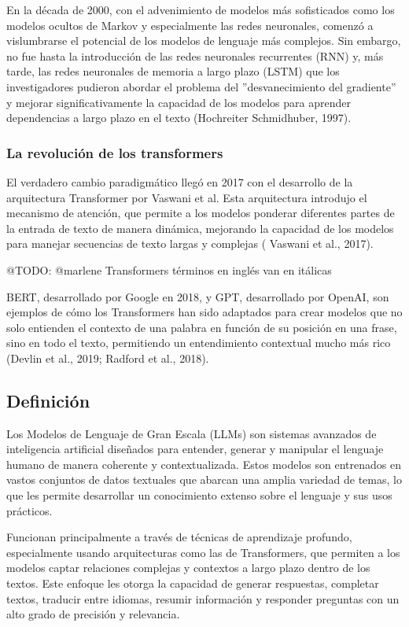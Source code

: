 En la década de 2000, con el advenimiento de modelos más sofisticados como los modelos ocultos de Markov
y especialmente las redes neuronales, comenzó a vislumbrarse el
potencial de los modelos de lenguaje más complejos.
Sin embargo, no fue hasta la introducción de las redes neuronales recurrentes (RNN) y, más tarde, las redes neuronales
de memoria a largo plazo (LSTM)
que los investigadores pudieron abordar el problema del ''desvanecimiento del gradiente''
y mejorar significativamente la capacidad de los
modelos para aprender dependencias a largo plazo en el texto (Hochreiter Schmidhuber, 1997).

\subsubsection*{La revolución de los transformers}
El verdadero cambio paradigmático llegó en 2017 con el desarrollo de la arquitectura
Transformer por Vaswani et al.
Esta arquitectura introdujo el mecanismo de atención, que permite a los modelos ponderar diferentes partes de la entrada
de texto de manera dinámica, mejorando la capacidad de los modelos para manejar secuencias de texto largas y complejas (
Vaswani et al., 2017).

\colorbox{color_highlight}{@TODO: @marlene Transformers términos en inglés van en itálicas}

BERT, desarrollado por Google en 2018, y GPT, desarrollado por OpenAI, son ejemplos de
cómo los Transformers han sido adaptados para crear modelos que
no solo entienden el contexto de una palabra en función de su posición en una frase, sino en todo
el texto, permitiendo un entendimiento contextual mucho más rico (Devlin et al., 2019; Radford et al., 2018).

\subsection{Definición}
Los Modelos de Lenguaje de Gran Escala (LLMs) son sistemas
avanzados de inteligencia artificial diseñados para entender, generar y
manipular el lenguaje humano de manera coherente y contextualizada. Estos
modelos son entrenados en vastos conjuntos de datos textuales que abarcan una amplia variedad de temas, lo que les
permite desarrollar un conocimiento extenso sobre el lenguaje y sus usos prácticos.

Funcionan principalmente a través de técnicas de aprendizaje
profundo, especialmente usando arquitecturas como las de Transformers,
que permiten a los modelos captar relaciones complejas y contextos a largo plazo dentro de los textos. Este enfoque les
otorga la capacidad de generar respuestas, completar textos,
traducir entre idiomas, resumir información y responder preguntas con un alto grado de precisión y relevancia.

